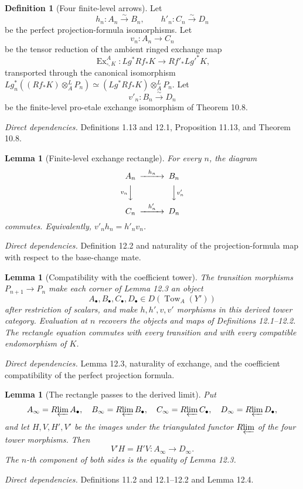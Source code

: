 \documentclass[10pt]{article}
\newtheorem{lemma}[theorem]{Lemma}
\theoremstyle{definition}
\newtheorem{definition}[theorem]{Definition}
\newcommand{\Rlim}{R\!\varprojlim}
\newcommand{\Ex}{\operatorname{Ex}}
\newcommand{\deps}[1]{\par\smallskip\textit{Direct dependencies.} #1\par}
\begin{document}
\begin{definition}[Four finite-level arrows]
Let
\[
 h_n:A_n\xrightarrow{\sim}B_n,
 \qquad h'_n:C_n\xrightarrow{\sim}D_n
\]
be the perfect projection-formula isomorphisms.  Let
\[
 v_n:A_n\to C_n
\]
be the tensor reduction of the ambient ringed exchange map
\[
 \Ex^A_{\square,K}:Lg^*Rf_*K\longrightarrow Rf'_*Lg'^*K,
\]
transported through the canonical isomorphism
$Lg_n^*((Rf_*K)\otimes_A^LP_n)
\simeq(Lg^*Rf_*K)\otimes_A^LP_n$.  Let
\[
 v'_n:B_n\xrightarrow{\sim}D_n
\]
be the finite-level pro-etale exchange isomorphism of Theorem 10.8.
\end{definition}
\deps{Definitions 1.13 and 12.1, Proposition 11.13, and Theorem 10.8.}

\begin{lemma}[Finite-level exchange rectangle]
For every $n$, the diagram
\[
\begin{CD}
 A_n @>{h_n}>> B_n\\
 @V{v_n}VV @VV{v'_n}V\\
 C_n @>{h'_n}>> D_n
\end{CD}
\]
commutes.  Equivalently, $v'_nh_n=h'_nv_n$.
\end{lemma}
\deps{Definition 12.2 and naturality of the projection-formula map with
respect to the base-change mate.}

\begin{lemma}[Compatibility with the coefficient tower]
The transition morphisms $P_{n+1}\to P_n$ make each corner of Lemma 12.3
an object
\[
 A_\bullet,B_\bullet,C_\bullet,D_\bullet
 \in D(\operatorname{Tow}_{A}(Y'))
\]
after restriction of scalars, and make $h,h',v,v'$ morphisms in this
derived tower category.  Evaluation at $n$ recovers the objects and maps
of Definitions 12.1--12.2.  The rectangle equation commutes with every
transition and with every compatible endomorphism of $K$.
\end{lemma}
\deps{Lemma 12.3, naturality of exchange, and the coefficient compatibility
of the perfect projection formula.}

\begin{lemma}[The rectangle passes to the derived limit]
Put
\[
 A_\infty=\Rlim A_\bullet,\quad
 B_\infty=\Rlim B_\bullet,\quad
 C_\infty=\Rlim C_\bullet,\quad
 D_\infty=\Rlim D_\bullet,
\]
and let $H,V,H',V'$ be the images under the triangulated functor $\Rlim$
of the four tower morphisms.  Then
\[
 V'H=H'V:A_\infty\longrightarrow D_\infty.
\]
The $n$-th component of both sides is the equality of Lemma 12.3.
\end{lemma}
\deps{Definitions 11.2 and 12.1--12.2 and Lemma 12.4.}
\end{document}
